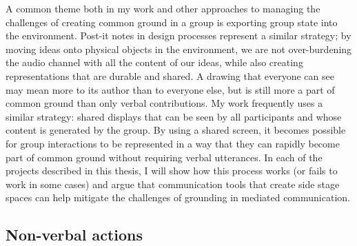 A common theme both in my work and other approaches to managing the challenges of creating common ground in a group is exporting group state into the environment. Post-it notes in design processes represent a similar strategy; by moving ideas onto physical objects in the environment, we are not over-burdening the audio channel with all the content of our ideas, while also creating representations that are durable and shared. A drawing that everyone can see may mean more to its author than to everyone else, but is still more a part of common ground than only verbal contributions. My work frequently uses a similar strategy: shared displays that can be seen by all participants and whose content is generated by the group. By using a shared screen, it becomes possible for group interactions to be represented in a way that they can rapidly become part of common ground without requiring verbal utterances. In each of the projects described in this thesis, I will show how this process works (or fails to work in some cases) and argue that communication tools that create side stage spaces can help mitigate the challenges of grounding in mediated communication.











\subsection{Non-verbal actions}


